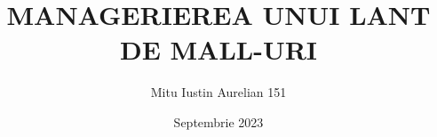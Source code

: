 \documentclass{article}
\title{MANAGERIEREA UNUI LANT DE MALL-URI}
\author{Mitu Iustin Aurelian 151}
\date{Septembrie 2023}
\begin{document}
\maketitle
\newpage

\renewcommand{\contentsname}{\centering Cuprins}
\renewcommand{\cftsecleader}{\cftdotfill{\cftdotsep}}
\renewcommand{\cftsecfont}{\bfseries}
\renewcommand{\cftsecpresnum}{\hspace{1em}}
\renewcommand{\cftsecindent}{\cftsecnumwidth}
\renewcommand{\cftsecnumwidth}{2.5em}

\tableofcontents
















\end{document}
